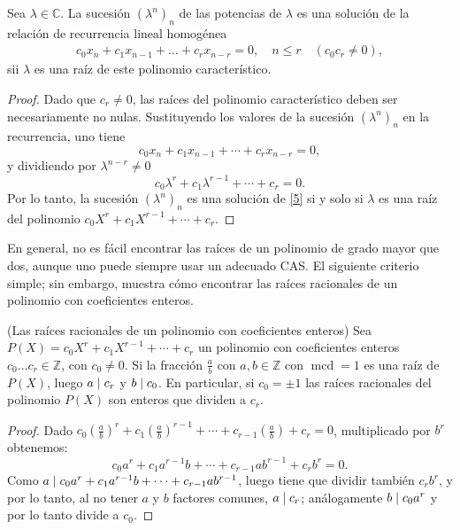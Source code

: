 \begin{proposition}{}
	Sea $\lambda\in\mathds{C}$. La sucesión $\left(\lambda^{n}\right)_{n}$ de las potencias de $\lambda$ es una solución de la relación de recurrencia lineal homogénea
		\begin{align}\label{5}
			c_{0}x_{n}+c_{1}x_{n-1}+\ldots+c_{r}x_{n-r}=0,\quad n\leq r \quad (c_{0}c_{r}\neq 0),
		\end{align}
	sii $\lambda$ es una raíz de este polinomio característico.
\end{proposition}

\begin{proof}
	Dado que $c_{r}\neq0$, las raíces del polinomio característico deben ser necesariamente no nulas. Sustituyendo los valores de la sucesión ${\left(\lambda^{n}\right)}_{n}$ en la recurrencia, uno tiene \[ c_{0}x_{n}+c_{1}x_{n-1}+\cdots+c_{r}x_{n-r}=0, \] y dividiendo por $\lambda^{n-r}\neq0$ \[ c_{0}\lambda^{r}+c_{1}\lambda^{r-1}+\cdots+c_{r}=0. \]	Por lo tanto, la sucesión ${\left(\lambda^{n}\right)}_{n}$ es una solución de \eqref{5} si y solo si $\lambda$ es una raíz del polinomio $c_{0}X^{r}+c_{1}X^{r-1}+\cdots+c_{r}$.
\end{proof}

En general, no es fácil encontrar las raíces de un polinomio de grado mayor que dos, aunque uno puede siempre usar un adecuado CAS. El siguiente criterio simple; sin embargo, muestra cómo encontrar las raíces racionales de un polinomio con coeficientes enteros.

\begin{proposition}(Las raíces racionales de un polinomio con coeficientes enteros)
	Sea $P(X)=c_{0}X^{r}+c_{1}X^{r-1}+\cdots+c_{r}$ un polinomio con coeficientes enteros $c_{0}\ldots c_{r}\in\mathds{Z}$, con $c_{0}\neq 0$. Si la fracción $\tfrac{a}{b}$ con $a,b\in\mathds{Z}$ con $\operatorname{mcd}=1$ es una raíz de $P(X)$, luego $a\mid c_{r}$ y $b\mid c_{0}$. En particular, si $c_{0}=\pm1$ las raíces racionales del polinomio $P(X)$ son enteros que dividen a $c_{r}$.
\end{proposition}

\begin{proof}
	Dado $c_{0}\left(\frac{a}{b}\right)^{r}+c_{1}{\left(\frac{a}{b}\right)}^{r-1}+\cdots+c_{r-1}\left(\frac{a}{b}\right)+c_{r}=0$, multiplicado por $b^{r}$ obtenemos: \[ 	c_{0}a^{r}+c_{1}a^{r-1}b+\cdots+c_{r-1}ab^{r-1}+c_{r}b^{r}=0. \] Como $a\mid c_{0}a^{r}+c_{1}a^{r-1}b+\cdots+c_{r-1}ab^{r-1}$, luego tiene que dividir también $c_{r}b^{r}$, y por lo tanto, al no tener $a$ y $b$ factores comunes, $a\mid c_{r}$; análogamente $b\mid c_{0}a^{r}$ y por lo tanto divide a $c_{0}$.
\end{proof}

